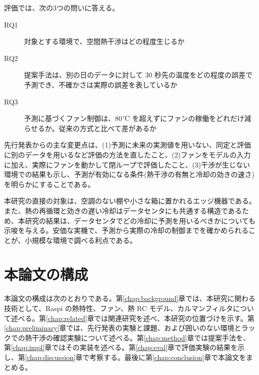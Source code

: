 評価では、次の3つの問いに答える。

\begin{description}
  \item[RQ1] 対象とする環境で、空間熱干渉はどの程度生じるか
  \item[RQ2] 提案手法は、別の日のデータに対して 30 秒先の温度をどの程度の誤差で予測でき、不確かさは実際の誤差を表しているか
  \item[RQ3] 予測に基づくファン制御は、80\,℃ を超えずにファンの稼働をどれだけ減らせるか。従来の方式と比べて差があるか
\end{description}

先行発表からの主な変更点は、(1)予測に未来の実測値を用いない、同定と評価に別のデータを用いるなど評価の方法を直したこと、(2)ファンをモデルの入力に加え、実際にファンを動かして閉ループで評価したこと、(3)干渉が生じない環境での結果も示し、予測が有効になる条件(熱干渉の有無と冷却の効きの速さ)を明らかにすることである。

本研究の直接の対象は、空調のない棚や小さな箱に置かれるエッジ機器である。また、熱の再循環と効きの遅い冷却はデータセンタにも共通する構造であるため、本研究の結果は、データセンタでどの冷却に予測を用いるべきかについても示唆を与える。安価な実機で、予測から実際の冷却の制御までを確かめられることが、小規模な環境で調べる利点である。

\section{本論文の構成}
本論文の構成は次のとおりである。第\ref{chap:background}章では、本研究に関わる技術として、Raspi の熱特性、ファン、熱 RC モデル、カルマンフィルタについて述べる。第\ref{chap:related}章では関連研究を述べ、本研究の位置づけを示す。第\ref{chap:preliminary}章では、先行発表の実験と課題、および囲いのない環境とラックでの熱干渉の確認実験について述べる。第\ref{chap:method}章では提案手法を、第\ref{chap:impl}章ではその実装を述べる。第\ref{chap:eval}章で評価実験の結果を示し、第\ref{chap:discussion}章で考察する。最後に第\ref{chap:conclusion}章で本論文をまとめる。
